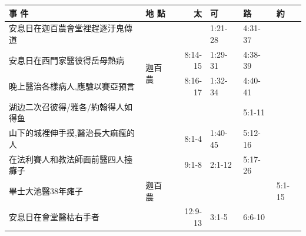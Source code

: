 \begin{table}[H]\centering 
\begin{tabular}{p{6.45em}|c|p{4.785em}|r|p{}|p{3.23em}|p{}}\toprule

\multicolumn{2}{p{20.em}|}{事 件} & 地 點& \multicolumn{1}{p{3.23em}|}{太} & \multicolumn{1}{p{3.23em}|}{可}    & \multicolumn{1}{p{3.23em}|}{路} & \multicolumn{1}{p{1.em}}{約} \\\midrule\midrule

\cmidrule{1-2}\cmidrule{4-7}\multicolumn{2}{p{20.em}|}{安息日在迦百農會堂裡趕逐汙鬼傳道} &\multicolumn{1}{l|}{\multirow{4}{*}{迦百農}}  &  & \multicolumn{1}{p{4.43em}|}{1:21-28} & \multicolumn{1}{p{3.5em}|}{4:31-37} & \multicolumn{1}{r}{} \\ 

\cmidrule{1-2}\cmidrule{4-7}\multicolumn{2}{p{20.em}|}{安息日在西門家醫彼得岳母熱病} && \multicolumn{1}{p{4.145em}|}{8:14-15} & \multicolumn{1}{p{4.43em}|}{1:29-31} & \multicolumn{1}{p{3.5em}|}{4:38-39} & \multicolumn{1}{r}{} \\ 

\cmidrule{1-2}\cmidrule{4-7}\multicolumn{2}{p{20.em}|}{晚上醫治各樣病人,應驗以賽亞预言} && \multicolumn{1}{p{4.145em}|}{8:16-17} & \multicolumn{1}{p{4.43em}|}{1:32-34} & \multicolumn{1}{p{3.5em}|}{4:40-41} &  \\ 


\cmidrule{1-2}\cmidrule{4-7}\multicolumn{2}{p{20.em}|}{湖边二次召彼得/雅各/約翰得人如得鱼} &  & \multicolumn{1}{p{4.145em}|}{} & \multicolumn{1}{p{4.43em}|}{} & \multicolumn{1}{p{3.5em}|}{5:1-11} &\\

\cmidrule{1-2}\cmidrule{4-7}\multicolumn{2}{p{20.5em}|}{山下的城裡伸手摸,醫治長大痲瘋的人} &  & \multicolumn{1}{p{4.145em}|}{8:1-4} & \multicolumn{1}{p{4.43em}|}{1:40-45} & \multicolumn{1}{p{3.5em}|}{5:12-16} & \multicolumn{1}{c}{} \\ \midrule

\multicolumn{2}{p{20.em}|}{在法利賽人和教法師面前醫四人擡癱子} & \multicolumn{1}{l|}{\multirow{5}{*}{迦百農}}& \multicolumn{1}{p{4.145em}|}{9:1-8} & \multicolumn{1}{p{4.43em}|}{2:1-12} & \multicolumn{1}{p{3.5em}|}{5:17-26} & \\


\multicolumn{2}{p{20.em}|}{畢士大池醫38年瘫子} & \multicolumn{1}{l|}{\multirow{5}{*}{耶京(更晚?)}}& &  & &\multicolumn{1}{p{3.95em}}{5:1-15}\\ \midrule


\multicolumn{2}{p{12.em}|}{安息日在會堂醫枯右手者}&\multicolumn{1}{p{7.1em}|}{離開麥地進會堂}&\multicolumn{1}{p{4.em}|}{12:9-13}&\multicolumn{1}{p{4.43em}|}{3:1-5}&\multicolumn{1}{p{4.em}|}{6:6-10}& \\ \midrule

\end{tabular}

\end{table}


